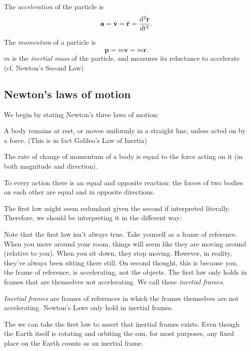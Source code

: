 \documentclass[a4paper]{article}
\begin{document}
\begin{defi}[Acceleration]
  The \emph{acceleration} of the particle is
  \[
    \mathbf{a} = \dot{\mathbf{v}} = \ddot{\mathbf{r}} = \frac{\mathrm{d}^2 \mathbf{r}}{d t^2}.
  \]
\end{defi}

\begin{defi}[Momentum]
  The \emph{momentum} of a particle is
  \[
    \mathbf{p} = m\mathbf{v} = m\dot{\mathbf{r}}.
  \]
  $m$ is the \emph{inertial mass} of the particle, and measures its reluctance to accelerate (cf. Newton's Second Law)
\end{defi}

\subsection{Newton's laws of motion}
We begin by stating Newton's three laws of motion:
\begin{law}
  A body remains at rest, or moves uniformly in a straight line, unless acted on by a force. (This is in fact Galileo's Law of Inertia)
\end{law}

\begin{law}
   The rate of change of momentum of a body is equal to the force acting on it (in both magnitude and direction).
\end{law}

\begin{law}
  To every action there is an equal and opposite reaction: the forces of two bodies on each other are equal and in opposite directions.
\end{law}
The first law might seem redundant given the second if interpreted literally. Therefore, we should be interpreting it in the different way:

Note that the first law isn't always true. Take yourself as a frame of reference. When you move around your room, things will seem like they are moving around (relative to you). When you sit down, they stop moving. However, in reality, they've always been sitting there still. On second thought, this is because you, the frame of reference, is accelerating, not the objects. The first law only holds in frames that are themselves not accelerating. We call these \emph{inertial frames}.
\begin{defi}
  \emph{Inertial frames} are frames of references in which the frames themselves are not accelerating. Newton's Laws only hold in inertial frames.
\end{defi}
The we can take the first law to assert that inertial frames exists. Even though the Earth itself is rotating and orbiting the sun, for most purposes, any fixed place on the Earth counts as an inertial frame.
\end{document}
